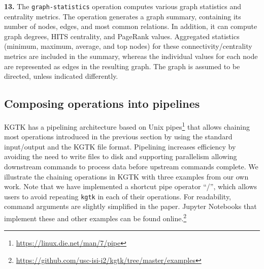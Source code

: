 \documentclass[runningheads]{llncs}
\newcommand{\kibitz}[2]{%
{\color{#1}#2}{}%
}
\newcommand{\DG}[1]{\kibitz{red}{[DG: #1]}} %
\begin{document}
\textbf{13.} The \texttt{graph-statistics} operation computes various graph statistics and centrality metrics. The operation generates a graph summary, containing its number of nodes, edges, and most common relations. In addition, it can compute graph degrees, HITS centrality, and PageRank values. Aggregated statistics (minimum, maximum, average, and top nodes) for these connectivity/centrality metrics are included in the summary, whereas the individual values for each node are represented as edges in the resulting graph. The graph is assumed to be directed, unless indicated differently.










\subsection{Composing operations into pipelines}\label{sec:chain}

KGTK has a pipelining architecture based on Unix pipes\footnote{\url{https://linux.die.net/man/7/pipe}} that allows chaining most operations introduced in the previous section by using the standard input/output and the KGTK file format. 
Pipelining increases efficiency by avoiding the need to write files to disk and supporting parallelism allowing downstream commands to process data before upstream commands complete.
We illustrate the chaining operations in KGTK with three examples from our own work. Note that we have implemented a shortcut pipe operator ``/'', which allows users to avoid repeating \texttt{kgtk} in each of their operations. For readability, command arguments are slightly simplified in the paper. Jupyter Notebooks that implement these and other examples can be found online.\footnote{\url{https://github.com/usc-isi-i2/kgtk/tree/master/examples}}   %
\end{document}
